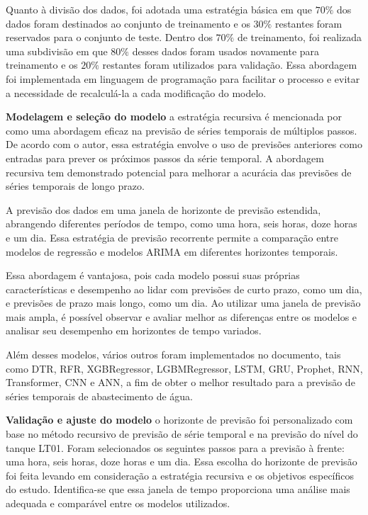 Quanto à divisão dos dados, foi adotada uma estratégia básica em que $70\%$ dos dados foram destinados ao conjunto de treinamento e os $30\%$ restantes foram reservados para o conjunto de teste. Dentro dos $70\%$ de treinamento, foi realizada uma subdivisão em que $80\%$ desses dados foram usados novamente para treinamento e os $20\% $ restantes foram utilizados para validação. Essa abordagem foi implementada em linguagem de programação para facilitar o processo e evitar a necessidade de recalculá-la a cada modificação do modelo.

\textbf{Modelagem e sele\c c\~ao do modelo}
a estratégia recursiva é mencionada por  como uma abordagem eficaz na previsão de séries temporais de múltiplos passos. De acordo com o autor, essa estratégia envolve o uso de previsões anteriores como entradas para prever os próximos passos da série temporal. A abordagem recursiva tem demonstrado potencial para melhorar a acurácia das previsões de séries temporais de longo prazo.

A previsão dos dados em uma janela de horizonte de previsão estendida, abrangendo diferentes períodos de tempo, como uma hora, seis horas, doze horas e um dia. Essa estratégia de previsão recorrente permite a comparação entre modelos de regressão e modelos ARIMA em diferentes horizontes temporais.

Essa abordagem é vantajosa, pois cada modelo possui suas próprias características e desempenho ao lidar com previsões de curto prazo, como um dia, e previsões de prazo mais longo, como um dia. Ao utilizar uma janela de previsão mais ampla, é possível observar e avaliar melhor as diferenças entre os modelos e analisar seu desempenho em horizontes de tempo variados.

Além desses modelos, vários outros foram implementados no documento, tais como DTR, RFR, XGBRegressor, LGBMRegressor, LSTM, GRU, Prophet, RNN, Transformer, CNN e ANN, a fim de obter o melhor resultado para a previsão de séries temporais de abastecimento de água.

\textbf{Validação e ajuste do modelo}
o horizonte de previsão foi personalizado com base no método recursivo de previsão de série temporal e na previsão do nível do tanque LT01. Foram selecionados os seguintes passos para a previsão à frente: uma hora, seis horas, doze horas e um dia. Essa escolha do horizonte de previsão foi feita levando em consideração a estratégia recursiva e os objetivos específicos do estudo. Identifica-se que essa janela de tempo proporciona uma análise mais adequada e comparável entre os modelos utilizados.

